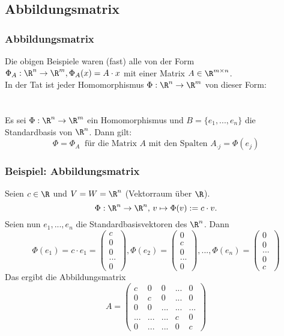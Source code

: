\subsection{Abbildungsmatrix}
%
\begin{frame}\frametitle{Abbildungsmatrix}
Die obigen Beispiele waren (fast) alle von der Form $\Phi_A : \R^n \to \R^m, \Phi_A(x)=A \cdot x$ mit einer Matrix $A \in \R^{m\times n}$. \pause\\ \vfill
In der Tat ist jeder Homomorphismus $\Phi: \R^n \to \R^m$ von dieser Form:\\\quad\\
\pause
{}\\
Es sei $\Phi:\R^n \to \R^m$ ein Homomorphismus und $B=\{e_1,...,e_n\}$ die Standardbasis von $\R^n$. Dann gilt:
$$
\Phi=\Phi_A \ \text{ für die Matrix } A \text{ mit den Spalten } A_{\cdot j}=\Phi(e_j)
$$
\end{frame}
%
\begin{frame}\frametitle{Beispiel: Abbildungsmatrix}
	Seien $c \in \R$ und $V=W=\R^n$ (Vektorraum über $\R$).
	$$
		\Phi: \R^n \to \R^n, \, v \mapsto \Phi(v) := c\cdot v.
	$$\pause
	Seien nun $e_1,...,e_n$ die Standardbasisvektoren des $\R^n$. Dann\pause
	$$
	\Phi(e_1)=c\cdot e_1=\begin{pmatrix} c \\ 0 \\ 0\\... \\0 \end{pmatrix}, \Phi(e_2)=\begin{pmatrix} 0 \\ c \\ 0 \\ ... \\0 \end{pmatrix},...,\Phi(e_n)=\begin{pmatrix} 0 \\ 0 \\ ... \\ 0 \\c \end{pmatrix}
	$$\pause
	Das ergibt die Abbildungsmatrix
	$$
	A=\begin{pmatrix} c & 0 &0&... &0\\ 0&c&0&...&0 \\ 0&0 & ...&...&...\\... &...&...&c&0\\0&...&...&0&c \end{pmatrix}
	$$
\end{frame}
%
